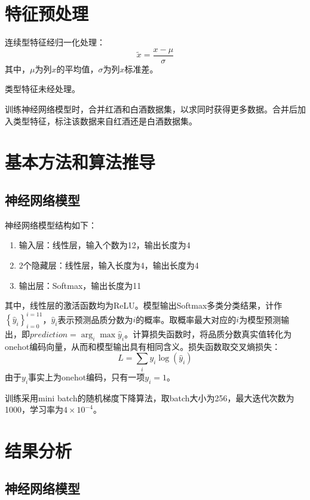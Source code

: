 \documentclass{article}
\begin{document}
\begin{CJK}{UTF8}{gbsn}

\section{特征预处理}

连续型特征经归一化处理：
$$
\tilde{x} = \frac{x - \mu}{\sigma}
$$
其中，$\mu$为列$x$的平均值，$\sigma$为列$x$标准差。

类型特征未经处理。

训练神经网络模型时，合并红酒和白酒数据集，以求同时获得更多数据。合并后加入类型特征，标注该数据来自红酒还是白酒数据集。

\section{基本方法和算法推导}
\subsection{神经网络模型}

神经网络模型结构如下：

\begin{enumerate}
    \item 输入层：线性层，输入个数为12，输出长度为4
    \item 2个隐藏层：线性层，输入长度为4，输出长度为4
    \item 输出层：Softmax，输出长度为11
\end{enumerate}

其中，线性层的激活函数均为ReLU。模型输出Softmax多类分类结果，计作$\left\{\hat y_i\right\}_{i=0}^{i=11}$，$\hat y_i$表示预测品质分数为$i$的概率。取概率最大对应的$i$为模型预测输出，即$prediction=\arg_i\max \hat y_i$。计算损失函数时，将品质分数真实值转化为onehot编码向量，从而和模型输出具有相同含义。损失函数取交叉熵损失：
$$
L = \sum_i y_i \log(\hat y_i)
$$
由于$y_i$事实上为onehot编码，只有一项$y_i=1$。

训练采用mini batch的随机梯度下降算法，取batch大小为256，最大迭代次数为1000，学习率为$4\times10^{-4}$。

\section{结果分析}
\subsection{神经网络模型}


\end{CJK}
\end{document}

